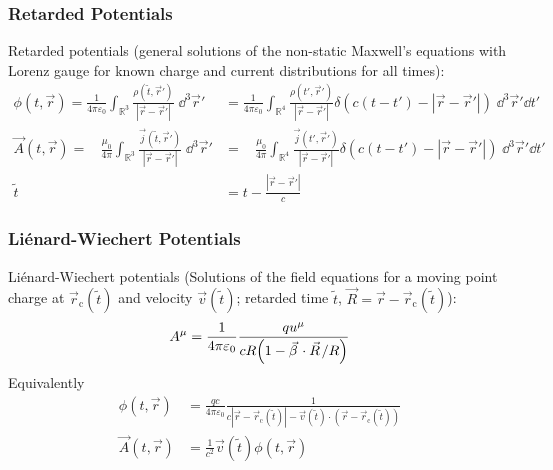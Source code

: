 		\subsubsection{Retarded Potentials}
			\label{Sec:RetardedPotentials}
			\noindent
			Retarded potentials (general solutions of the non-static Maxwell's equations with Lorenz gauge for known charge and current distributions for all times):
			\begin{equation}
				\begin{aligned}
					\phi\left(t,\vec{r}\right)
					= \frac{1}{4\pi\varepsilon_0} \int_{\mathbb{R}^3} \frac{\rho(\tilde{t},\vec{r}')}{\left|\vec{r}-\vec{r}'\right|}\;\dd^3 \vec{r}'
					&=	\frac{1}{4\pi\varepsilon_0} \int_{\mathbb{R}^4} \frac{\rho(t',\vec{r}')}{\left|\vec{r}-\vec{r}'\right|}\delta\left( c(t-t')-\left|\vec{r}-\vec{r}'\right|\right)\;\dd^3 \vec{r}'\dd t' \\
					\vec{A}\left(t,\vec{r}\right)
					= \phantom{\varepsilon_0} \frac{\mu_0}{4\pi} \int_{\mathbb{R}^3} \frac{\vec{j}(\tilde{t},\vec{r}')}{\left|\vec{r}-\vec{r}'\right|}\;\dd^3 \vec{r}'
					&=	\phantom{\varepsilon_0} \frac{\mu_0}{4\pi} \int_{\mathbb{R}^4} \frac{\vec{j}(t',\vec{r}')}{\left|\vec{r}-\vec{r}'\right|}\delta\left( c(t-t')-\left|\vec{r}-\vec{r}'\right|\right)\;\dd^3 \vec{r}'\dd t' \\
					\tilde{t}&=t-\frac{\left|\vec{r}-\vec{r}'\right|}{c}
				\end{aligned}
			\end{equation}

		\subsubsection{Liénard-Wiechert Potentials}
			\noindent
			Liénard-Wiechert potentials (Solutions of the field equations for a moving point charge at $\vec{r}_\text{c}(\tilde{t})$ and velocity $\vec{v}(\tilde{t})$; retarded time $\tilde{t}$, $\vec{R}= \vec{r}-\vec{r}_\text{c}(\tilde{t})$):
			\begin{equation}
				A^\mu = \frac{1}{4\pi\varepsilon_0} \frac{q u^\mu}{c R \qty(1 - \vec{\beta}\cdot\vec{R}/R) }
			\end{equation}
			Equivalently
			\begin{equation}
				\begin{aligned}
					\phi(t,\vec{r}) & =\frac{q c}{4\pi \varepsilon_0}\frac{1}{c \left|\vec{r}-\vec{r}_\text{c}(\tilde{t})\right|-\vec{v}(\tilde{t})\cdot\left(\vec{r}-\vec{r}_\text{c}(\tilde{t})\right)} \\
					\vec{A}(t,\vec{r}) &= \frac{1}{c^2}\vec{v}(\tilde{t})\phi(t,\vec{r}) \\
				\end{aligned}
			\end{equation}


